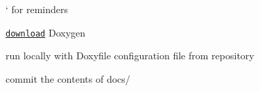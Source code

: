 
\begin{DoxyRefList}
\item[\label{todo__todo000001}%
\Hypertarget{todo__todo000001}%
Page \hyperlink{md__r_e_a_d_m_e}{Mu\+MoT} ]` for reminders
\begin{DoxyItemize}
\item \href{http://www.stack.nl/~dimitri/doxygen/download.html}{\tt download} Doxygen
\item run locally with {\ttfamily Doxyfile} configuration file from repository
\item commit the contents of {\ttfamily docs/}
\end{DoxyItemize}
\end{DoxyRefList}